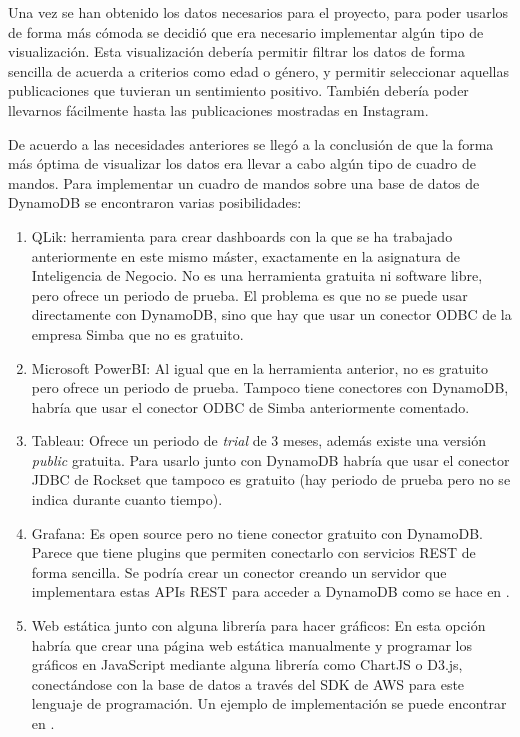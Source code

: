 Una vez se han obtenido los datos necesarios para el proyecto, para poder usarlos de forma más cómoda se decidió que era necesario implementar algún tipo de visualización. Esta visualización debería permitir filtrar los datos de forma sencilla de acuerda a criterios como edad o género, y permitir seleccionar aquellas publicaciones que tuvieran un sentimiento positivo. También debería poder llevarnos fácilmente hasta las publicaciones mostradas en Instagram.

De acuerdo a las necesidades anteriores se llegó a la conclusión de que la forma más óptima de visualizar los datos era llevar a cabo algún tipo de cuadro de mandos. Para implementar un cuadro de mandos sobre una base de datos de DynamoDB se encontraron varias posibilidades:

\begin{enumerate}
    \item QLik: herramienta para crear dashboards con la que se ha trabajado anteriormente en este mismo máster, exactamente en la asignatura de Inteligencia de Negocio. No es una herramienta gratuita ni software libre, pero ofrece un periodo de prueba. El problema es que no se puede usar directamente con DynamoDB, sino que hay que usar un conector ODBC de la empresa Simba que no es gratuito.
    \item Microsoft PowerBI: Al igual que en la herramienta anterior, no es gratuito pero ofrece un periodo de prueba. Tampoco tiene conectores con DynamoDB, habría que usar el conector ODBC de Simba anteriormente comentado.
    \item Tableau: Ofrece un periodo de \textit{trial} de 3 meses, además existe una versión \textit{public} gratuita. Para usarlo junto con DynamoDB habría que usar el conector JDBC de Rockset que tampoco es gratuito (hay periodo de prueba pero no se indica durante cuanto tiempo).
    \item Grafana: Es open source pero no tiene conector gratuito con DynamoDB. Parece que tiene plugins que permiten conectarlo con servicios REST de forma sencilla. Se podría crear un conector creando un servidor que implementara estas APIs REST para acceder a DynamoDB como se hace en \cite{grafana_lambda_api}.
    \item Web estática junto con alguna librería para hacer gráficos: En esta opción habría que crear una página web estática manualmente y programar los gráficos en JavaScript mediante alguna librería como ChartJS o D3.js, conectándose con la base de datos a través del SDK de AWS para este lenguaje de programación. Un ejemplo de implementación se puede encontrar en \cite{web_chartjs}.
\end{enumerate}

